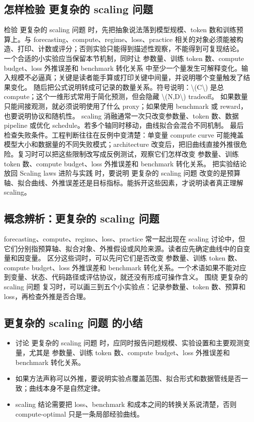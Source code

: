 \documentclass[a4paper]{article}
\begin{document}
\subsection{怎样检验 更复杂的 scaling 问题}
检验 更复杂的 scaling 问题 时，先把抽象说法落到模型规模、token 数和训练预算上。与 forecasting、compute、regime、loss、practice 相关的对象必须能被构造、打印、计数或评分；否则实验只能得到描述性观察，不能得到可复现结论。
一个合适的小实验应当保留本节机制，同时让 参数量、训练 token 数、compute budget、loss 外推误差和 benchmark 转化关系 中至少一个量发生可解释变化。输入规模不必逼真；关键是读者能手算或打印关键中间量，并说明哪个变量触发了结果变化。
随后把公式说明转成可记录的数量关系。符号说明：\textbackslash{}(C\textbackslash{}) 是总 compute；这个一维形式常用于简化预测，但会隐藏 \textbackslash{}(N,D\textbackslash{}) tradeoff。 如果数量只能间接观测，就必须说明使用了什么 proxy；如果使用 benchmark 或 reward，也要说明协议和随机性。
scaling 消融通常一次只改变参数量、token 数、数据 pipeline 或优化 schedule。若多个轴同时移动，曲线拟合会混合不同机制。
最后检查失败条件。工程判断往往在反例中变清楚：单变量 compute curve 可能掩盖模型大小和数据量的不同失败模式；architecture 改变后，把旧曲线直接外推很危险。复习时可以把这些限制改写成反例测试，观察它们怎样改变 参数量、训练 token 数、compute budget、loss 外推误差和 benchmark 转化关系。
把实验结论放回 Scaling laws 进阶与实践 时，要说明 更复杂的 scaling 问题 改变的是预算轴、拟合曲线、外推误差还是目标指标。能拆开这些因素，才说明读者真正理解 scaling。
\subsection{概念辨析：更复杂的 scaling 问题}
forecasting、compute、regime、loss、practice 常一起出现在 scaling 讨论中，但它们分别指预算轴、拟合对象、外推假设或风险来源。读者应先确定曲线中的自变量和因变量。
区分这些词时，可以先问它们是否改变 参数量、训练 token 数、compute budget、loss 外推误差和 benchmark 转化关系。一个术语如果不能对应到变量、状态、代码路径或评估协议，就还没有形成可操作含义。
围绕 更复杂的 scaling 问题 复习时，可以画三到五个小实验点：记录参数量、token 数、预算和 loss，再检查外推是否合理。
\subsection{更复杂的 scaling 问题 的小结}
\begin{itemize}
\item 讨论 更复杂的 scaling 问题 时，应同时报告问题规模、实验设置和主要观测变量，尤其是 参数量、训练 token 数、compute budget、loss 外推误差和 benchmark 转化关系。
\item 如果方法声称可以外推，要说明实验点覆盖范围、拟合形式和数据管线是否一致；曲线本身不是自然定律。
\item scaling 结论需要把 loss、benchmark 和成本之间的转换关系说清楚，否则 compute-optimal 只是一条局部经验曲线。
\end{itemize}
\end{document}
